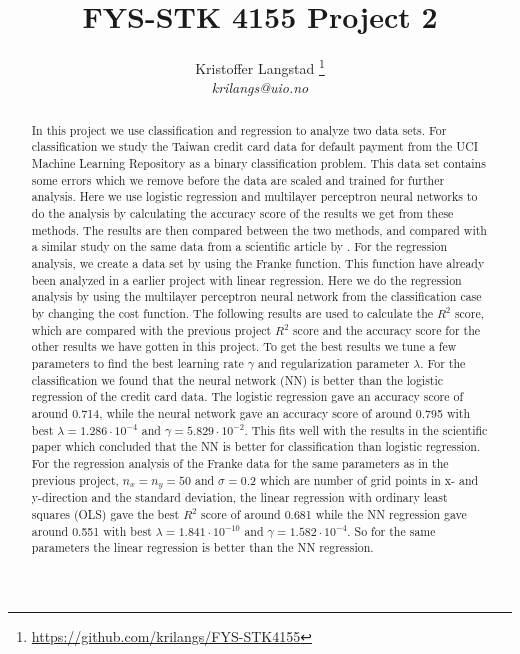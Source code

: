 \documentclass[12pt,a4paper,english]{article}
\title{FYS-STK 4155 Project 2}
\date{}
\author{ Kristoffer Langstad \footnote{\url{https://github.com/krilangs/FYS-STK4155}}\\ \textit{krilangs@uio.no}}
\begin{document}
\maketitle
\begin{abstract}
In this project we use classification and regression to analyze two data sets. For classification we study the Taiwan credit card data for default payment from the UCI Machine Learning Repository \cite{UCI} as a binary classification problem. This data set contains some errors which we remove before the data are scaled and trained for further analysis. Here we use logistic regression and multilayer perceptron neural networks to do the analysis by calculating the accuracy score of the results we get from these methods. The results are then compared between the two methods, and compared with a similar study on the same data from a scientific article by \citet{origarticle}. For the regression analysis, we create a data set by using the Franke function. This function have already been analyzed in a earlier project \cite{proj1} with linear regression. Here we do the regression analysis by using the multilayer perceptron neural network from the classification case by changing the cost function. The following results are used to calculate the $R^2$ score, which are compared with the previous project $R^2$ score and the accuracy score for the other results we have gotten in this project. To get the best results we tune a few parameters to find the best learning rate $\gamma$ and regularization parameter $\lambda$. For the classification we found that the neural network (NN) is better than the logistic regression of the credit card data. The logistic regression gave an accuracy score of around 0.714, while the neural network gave an accuracy score of around 0.795 with best $\lambda=1.286\cdot10^{-4}$ and $\gamma=5.829\cdot10^{-2}$. This fits well with the results in the scientific paper which concluded that the NN is better for classification than logistic regression. For the regression analysis of the Franke data for the same parameters as in the previous project, $n_x=n_y=50$ and $\sigma=0.2$ which are number of grid points in x- and y-direction and the standard deviation, the linear regression with ordinary least squares (OLS) gave the best $R^2$ score of around 0.681 while the NN regression gave around 0.551 with best $\lambda=1.841\cdot10^{-10}$ and $\gamma=1.582\cdot10^{-4}$. So for the same parameters the linear regression is better than the NN regression.
\end{abstract}
\end{document}
